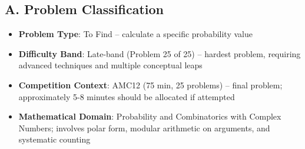 \documentclass[]{article}
\begin{document}
\begin{problemconfigbox}
\subsection*{A. Problem Classification}
\begin{itemize}[leftmargin=*]
    \item \textbf{Problem Type}: To Find -- calculate a specific probability value
    \item \textbf{Difficulty Band}: Late-band (Problem 25 of 25) -- hardest problem, requiring advanced techniques and multiple conceptual leaps
    \item \textbf{Competition Context}: AMC12 (75 min, 25 problems) -- final problem; approximately 5-8 minutes should be allocated if attempted
    \item \textbf{Mathematical Domain}: Probability and Combinatorics with Complex Numbers; involves polar form, modular arithmetic on arguments, and systematic counting
\end{itemize}


\end{problemconfigbox}
\end{document}
